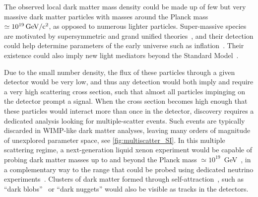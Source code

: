 The observed local dark matter mass density could be made up of few but very massive dark matter particles with masses around the Planck mass $\simeq 10^{19}\, \mathrm{GeV/c^2}$, as opposed to numerous lighter particles. Super-massive species are motivated by supersymmetric and grand unified theories~\cite{Kolb:2017jvz}, and their detection could help determine parameters of the early universe such as inflation~\cite{Chung:1998zb}. Their existence could also imply new light mediators beyond the Standard Model~\cite{Davoudiasl:2018wxz}. 

Due to the small number density, the flux of these particles through a given detector would be very low, and thus any detection would both imply and require a very high scattering cross section, such that almost all particles impinging on the detector prompt a signal. When the cross section becomes high enough that these particles would interact more than once in the detector, discovery requires a dedicated analysis looking for multiple-scatter events. Such events are typically discarded in WIMP-like dark matter analyses, leaving many orders of magnitude of unexplored parameter space, see \autoref{fig:multiscatter_SI}. In this multiple scattering regime, a next-generation liquid xenon experiment would be capable of probing dark matter masses up to and beyond the Planck mass $\simeq 10^{19}$~GeV~\cite{Bramante:2018qbc}, in a complementary way to the range that could be probed using dedicated neutrino experiments~\cite{Bramante:2018tos,Clark:2020mna}.
Clusters of dark matter formed through self-attraction~\cite{Butcher:2016hic}, such as ``dark blobs''~\cite{Grabowska:2018lnd} or ``dark nuggets''\cite{Coskuner:2018are} would also be visible as tracks in the detectors.



